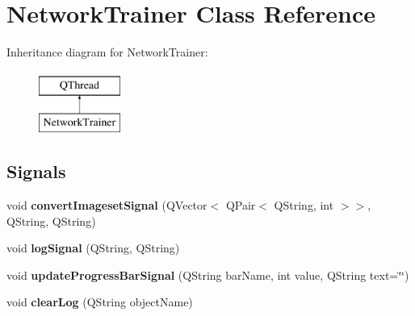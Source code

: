 \hypertarget{class_network_trainer}{}\section{Network\+Trainer Class Reference}
\label{class_network_trainer}
Inheritance diagram for Network\+Trainer\+:\begin{figure}[H]
\begin{center}
\leavevmode
\includegraphics[height=2.000000cm]{class_network_trainer}
\end{center}
\end{figure}
\subsection*{Signals}
\begin{DoxyCompactItemize}
\item 
\mbox{\label{class_network_trainer_af9217312013c1469479b8aeea922464e}} 
void {\bfseries convert\+Imageset\+Signal} (Q\+Vector$<$ Q\+Pair$<$ Q\+String, int $>$$>$, Q\+String, Q\+String)
\item 
\mbox{\label{class_network_trainer_a373176bc125ba3d522c990767dc7257c}} 
void {\bfseries log\+Signal} (Q\+String, Q\+String)
\item 
\mbox{\label{class_network_trainer_a0dde4e9726bb19536822f4a917438261}} 
void {\bfseries update\+Progress\+Bar\+Signal} (Q\+String bar\+Name, int value, Q\+String text=\char`\"{}\char`\"{})
\item 
\mbox{\label{class_network_trainer_a9eada8b873c48929429a2a49650e4bfc}} 
void {\bfseries clear\+Log} (Q\+String object\+Name)
\end{DoxyCompactItemize}
